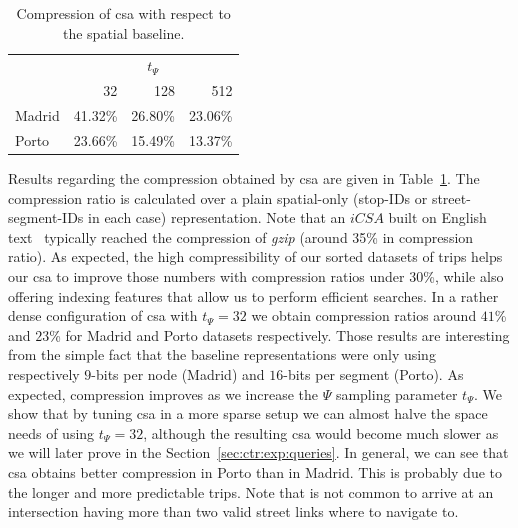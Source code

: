 	\begin{table}[ht]
	\begin{center}
	\caption{Compression of \acrshort{csa} with respect to the spatial baseline.}
	\label{table:ctr:exp:space:spat}
	  \begin{tabular}{|l|*{3}{r}|}
	  \cline{2-4}
	  \multicolumn{1}{c|}{} & \multicolumn{3}{c|}{$t_{\Psi}$ } \\
	  \multicolumn{1}{c|}{} & 32 & 128 & 512 \\
	  \hline
	  Madrid & 41.32\% & 26.80\% & 23.06\% \\
	  Porto & 23.66\% & 15.49\% & 13.37\% \\
	  \hline
	  \end{tabular}
	\end{center}
	\end{table}

	Results regarding the compression obtained by \gls{csa} are given in Table~\ref{table:ctr:exp:space:spat}.
	The compression ratio is calculated over a plain spatial-only (stop-IDs or street-segment-IDs in each case) representation.
	Note that an $iCSA$  built on English text~\cite{FBNCPR12} typically
	reached the compression of {\em gzip} (around 35\% in compression ratio).
	As expected, the high compressibility of our sorted datasets of trips helps our \gls{csa} to improve those numbers with compression ratios under 30\%, while also offering indexing features
	that allow us to perform efficient searches.
	In a rather dense 
	configuration of \gls{csa} with $t_{\Psi}=32$ we obtain compression ratios around $41$\% and $23$\% for Madrid and Porto datasets respectively.
	Those results are interesting from the simple fact that the baseline representations were only using respectively 
	$9$-bits per node (Madrid) and $16$-bits per segment (Porto). 
	As expected, compression improves as we increase the $\Psi$ sampling parameter $t_{\Psi}$. We show that by tuning 
	\gls{csa} in a more sparse setup we can almost halve the space needs of using $t_{\Psi}=32$, although the resulting \gls{csa} would become
	much slower as we will later prove in the Section~\ref{sec:ctr:exp:queries}.
	In general, we can see that \gls{csa} obtains better compression in Porto than in Madrid. This is probably due to the longer and
	more predictable trips. Note that is not common to arrive at an intersection having more than two valid street links where to navigate to.

